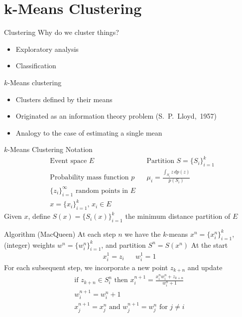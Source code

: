 \documentclass[12pt]{beamer}
\begin{document}
\section{k-Means Clustering}
\begin{frame}{Clustering}
\vfill
Why do we cluster things?
\begin{itemize}
	\item Exploratory analysis
	\item Classification
\end{itemize}
\vfill
$k$-Means clustering
\begin{itemize}
	\item Clusters defined by their means
	\item Originated as an information theory problem (S.~P.~Lloyd,~1957)
	\item Analogy to the case of estimating a single mean
\end{itemize}
\vfill
\end{frame}

\begin{frame}{$k$-Means Clustering}
\vfill
Notation
\begin{align*}
	&\text{Event space } E& &\text{Partition } S=\{S_i\}_{i=1}^k \\
	&\text{Probability mass function } p& &\mu_i = \frac{\int_{S_i} z\,dp(z)}{p(S_i)} \\
	&\{z_i\}_{i=1}^{\infty} \text{ random points in $E$}& \\
	&x = \{x_i\}_{i=1}^k,\,x_i \in E&
\end{align*}
Given $x$, define $S(x) = \{S_i(x)\}_{i=1}^k$ the minimum distance partition of $E$
\vfill
\end{frame}

\begin{frame}{Algorithm (MacQueen)}
\vfill
At each step $n$ we have the $k$-means $x^n=\{x_i^n\}_{i=1}^k$, (integer) weights
$w^n=\{w_i^n\}_{i=1}^k$, and partition $S^n=S(x^n)$
\vfill
At the start
\begin{align*}
	&x_i^1 = z_i& &w_i^1 = 1&
\end{align*}
\vfill
For each subsequent step, we incorporate a new point $z_{k+n}$ and update
\begin{align*}
	\text{if } z_{k+n} \in S_i^n \text{ then } x_i^{n+1} = 
		\frac{x_i^n w_i^n + z_{k+n}}{w_i^n + 1} \\
	w_i^{n+1} = w_i^n + 1 \\
	x_j^{n+1} = x_j^n \text{ and } w_j^{n+1} = w_j^n \text{ for } j \neq i
\end{align*}
\vfill
\end{frame}
\end{document}
